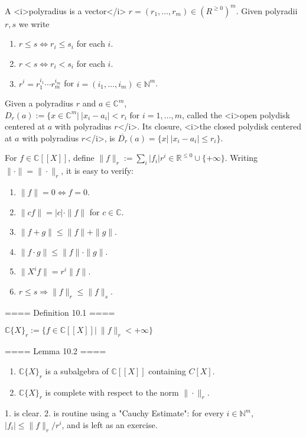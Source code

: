 
A <i>polyradius is a vector</i> $r = (r_1,\ldots, r_m)\in (R^{\geq 0})^m$.
Given polyradii $r,s$ we write
\begin{enumerate}
  \item  $r\leq s \Leftrightarrow r_i \leq s_i$ for each $i$.
  \item  $r < s \Leftrightarrow r_i < s_i$ for each $i$.
  \item  $r^i = r_1^{i_1}\cdots r_m^{i_m}$ for $i = (i_1,\ldots, i_m)\in \mathbb{N}^m$.
\end{enumerate}

Given a polyradius $r$ and $a\in \mathbb{C}^m$, $D_r(a):= \{x\in \mathbb{C}^m |\ |x_i - a_i| < r_i
\textrm{ for } i = 1,\ldots,m$, called the <i>open polydisk centered at $a$ with polyradius $r$</i>.
Its closure, <i>the closed polydisk centered at $a$ with polyradius $r$</i>, is $\overline{D_r}(a) = \{x | \ |x_i - a_i| \leq r_i\}$.

For $f\in \mathbb{C}[[X]]$, define $\|f\|_r := \sum_i |f_i| r^i \in \mathbb{R}^{\leq 0} \cup \{+\infty\}$.
Writing $\|\cdot \| = \|\cdot \|_r$, it is easy to verify:
\begin{enumerate}
  \item  $\|f\| = 0 \Leftrightarrow f = 0$.
  \item  $\|c f\| = |c| \cdot \|f\|$ for $c\in \mathbb{C}$.
  \item  $\|f + g\| \leq \|f\| + \|g\|$.
  \item  $\|f\cdot g\| \leq \|f\| \cdot \|g\|$.
  \item  $\|X^i f\| = r^i \|f\|$.
  \item  $r\leq s \Rightarrow \|f\|_r \leq \|f\|_s$.
\end{enumerate}

==== Definition 10.1 ====

$\mathbb{C}\{X\}_r := \{f\in \mathbb{C}[[X]] |\ \|f\|_r < +\infty \}$

==== Lemma 10.2 ====

\begin{enumerate}
  \item  $\mathbb{C} \{X\}_r$ is a subalgebra of $\mathbb{C}[[X]]$ containing $C[X]$.
  \item  $\mathbb{C} \{X\}_r$ is complete with respect to the norm $\|\cdot\|_r$.
\end{enumerate}

1. is clear. 2. is routine using a "Cauchy Estimate": for every $i\in \mathbb{N}^m$, $|f_i|\leq \|f\|_r/r^i$,
and is left as an exercise.

